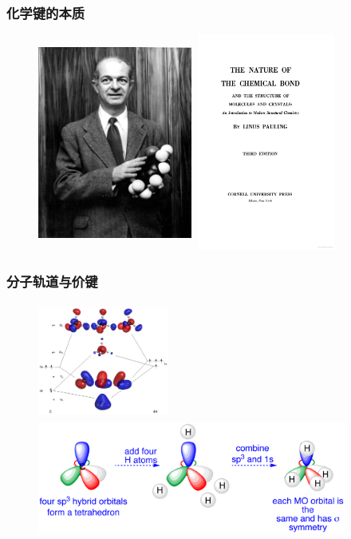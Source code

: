 \frame
{
	\frametitle{化学键的本质}
\begin{figure}[h!]
\centering
\vspace{-10.5pt}
\includegraphics[height=2.80in,width=2.00in,viewport=0 0 1600 2050,clip]{Figures/Linus_Pauling.jpeg}
\includegraphics[height=2.80in,width=1.85in,viewport=0 0 420 650,clip]{Figures/The-Nature-of-the-Chemical-Bond_content.png}
\label{Pauling:Bond_Hybrid}
\end{figure}
}

\frame
{
	\frametitle{分子轨道与价键}
\begin{figure}[h!]
\centering
\vspace{-10.5pt}
\includegraphics[height=1.50in,width=1.70in,viewport=0 0 820 680,clip]{Figures/MO-CH4.jpg}
\includegraphics[height=1.45in,width=4.00in,viewport=0 0 2100 750,clip]{Figures/methane-sp3.png}
\label{MO-vs-VB:CH4}
\end{figure}
}

